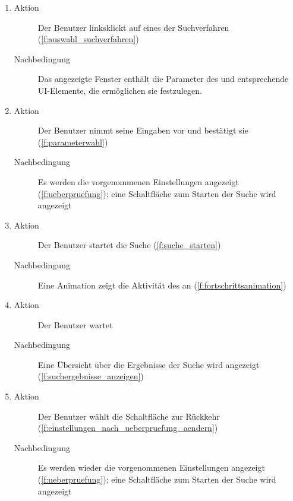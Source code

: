 \begin{enumerate} [label=\bfseries /TS \arabic*0/, leftmargin=*]
\begin{enumerate}[leftmargin=0pt, itemindent=0pt]
		\begin{description}
			\item[Aktion] Der Benutzer fährt mit der Maus über ein \gls{Suchverfahren}
			\item[Nachbedingung] Es wird eine Beschreibung des  angezeigt (\ref{f:beschreibung_suchverfahren})
		\end{description}
		\item
		\begin{description}
			\item[Aktion] Der Benutzer linksklickt auf eines der \gls{Suchverfahren} (\ref{f:auswahl_suchverfahren})
			\item[Nachbedingung] Das angezeigte Fenster enthält die Parameter des  und entsprechende UI-Elemente, die ermöglichen sie festzulegen.
		\end{description}
		\item
		\begin{description}
			\item[Aktion] Der Benutzer nimmt seine Eingaben vor und bestätigt sie (\ref{f:parameterwahl})
			\item[Nachbedingung] Es werden die vorgenommenen Einstellungen angezeigt (\ref{f:ueberpruefung}); eine Schaltfläche zum Starten der Suche wird angezeigt
		\end{description}
		\item
		\begin{description}
			\item[Aktion] Der Benutzer startet die Suche (\ref{f:suche_starten})
			\item[Nachbedingung] Eine Animation zeigt die Aktivität des  an (\ref{f:fortschrittsanimation})
		\end{description}
		\item
		\begin{description}
			\item[Aktion] Der Benutzer wartet
			\item[Nachbedingung] Eine Übersicht über die Ergebnisse der Suche wird angezeigt (\ref{f:suchergebnisse_anzeigen})
		\end{description}
		\item
		\begin{description}
			\item[Aktion] Der Benutzer wählt die Schaltfläche zur Rückkehr (\ref{f:einstellungen_nach_ueberpruefung_aendern})
			\item[Nachbedingung] Es werden wieder die vorgenommenen Einstellungen angezeigt (\ref{f:ueberpruefung}); eine Schaltfläche zum Starten der Suche wird angezeigt

\end{description}
\end{enumerate}
\end{enumerate}
